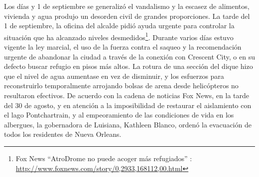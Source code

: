 Los días y 1 de septiembre se generalizó el vandalismo y la escasez de
alimentos, vivienda y agua produjo un desorden civil de grandes proporciones. La
tarde del 1 de septiembre, la oficina del alcalde pidió ayuda urgente para
controlar la situación que ha alcanzado niveles desmedidos\footnote{Fox News
``AtroDrome no puede acoger más refugiados'' :
\url{http://www.foxnews.com/story/0,2933,168112,00.html}}. Durante varios días
estuvo vigente la ley marcial, el uso de la fuerza contra el saqueo y la
recomendación urgente de abandonar la ciudad a través de la conexión con
Crescent City, o en su defecto buscar refugio en pisos más altos. La rotura de
una sección del dique hizo que el nivel de agua aumentase en vez de disminuir, y
los esfuerzos para reconstruirlo temporalmente arrojando bolsas de arena desde
helicópteros no resultaron efectivos. De acuerdo con la cadena de noticias Fox
News, en la tarde del 30 de agosto, y en atención a la imposibilidad de
restaurar el aislamiento con el lago Pontchartrain, y al empeoramiento de las
condiciones de vida en los albergues, la gobernadora de Luisiana, Kathleen
Blanco, ordenó la evacuación de todos los residentes de Nueva Orleans.

